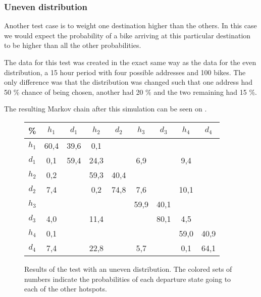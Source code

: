 \subsubsection{Uneven distribution}
Another test case is to weight one destination higher than the others.
In this case we would expect the probability of a bike arriving at this particular destination to be higher than all the other probabilities.

The data for this test was created in the exact same way as the data for the even distribution, a 15 hour period with four possible addresses and 100 bikes.
The only difference was that the distribution was changed such that one address had 50 \% chance of being chosen, another had 20 \% and the two remaining had 15 \%.


The resulting Markov chain after this simulation can be seen on .

\begin{figure}
	\centering
	\begin{tabular}{|c | c c c c c c c c|}
		\hline
		\% &      $ h_1 $ & $ d_1 $ & $ h_2 $ & $ d_2 $ & $ h_3 $ & $ d_3 $ & $ h_4 $ & $ d_4 $\\
		\hline
		$ h_1 $ & 60,4 &  39,6 &   0,1 &   &   &   &   &  \\
		$ d_1 $ & 0,1 &  59,4 &  {\color{red}24,3} &   &   {\color{red}6,9} &   &   {\color{red}9,4} &  \\
		$ h_2 $ & 0,2 &   &  59,3 &  40,4 &   &   &   &  \\
		$ d_2 $ & {\color{blue}7,4} &   &   0,2 &  74,8 &   {\color{blue}7,6} &   &  {\color{blue}10,1} &  \\
		$ h_3 $ & &   &   &   &  59,9 &  40,1 &   &  \\
		$ d_3 $ & {\color{orange}4,0} &   &  {\color{orange}11,4} &   &   &  80,1 &   {\color{orange}4,5} &  \\
		$ h_4 $ & 0,1 &   &   &   &   &   &  59,0 &  40,9\\
		$ d_4 $ & {\color{purple}7,4} &   &  {\color{purple}22,8} &   &   {\color{purple}5,7} &   &   0,1 &  64,1\\
		\hline
	\end{tabular}
	\caption{Results of the test with an uneven distribution. The colored sets of numbers indicate the probabilities of each departure state going to each of the other hotspots.}\label{test_uneven}
\end{figure}


